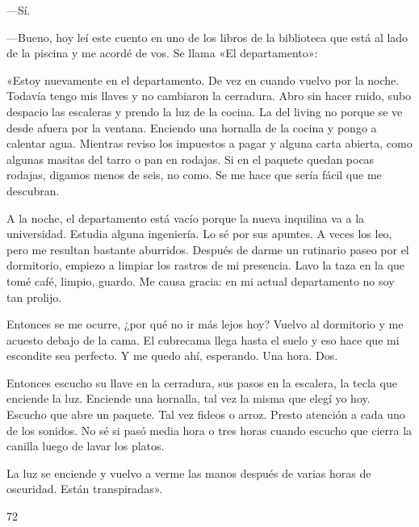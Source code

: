 \documentclass[12pt,twoside,openright,a5paper]{book}
\begin{document}
---Sí.

---Bueno, hoy leí este cuento en uno de los libros de la biblioteca que está
al lado de la piscina y me acordé de vos. Se llama «El departamento»:

«Estoy nuevamente en el departamento. De vez en cuando vuelvo por la
noche. Todavía tengo mis llaves y no cambiaron la cerradura. Abro sin hacer
ruido, subo despacio las escaleras y prendo la luz de la cocina. La del
living no porque se ve desde afuera por la ventana. Enciendo una hornalla
de la cocina y pongo a calentar agua. Mientras reviso los
impuestos a pagar y alguna carta abierta, como algunas masitas del tarro
o pan en rodajas. Si en el paquete quedan pocas rodajas, digamos menos de
seis, no como. Se me hace que sería fácil que me descubran.

A la noche, el departamento está vacío porque la nueva inquilina va a la
universidad. Estudia alguna ingeniería. Lo sé por sus apuntes. A veces los
leo, pero me resultan bastante aburridos. Después de darme un rutinario
paseo por el dormitorio, empiezo a limpiar los rastros de mi presencia. Lavo
la taza en la que tomé café, limpio, guardo. Me causa gracia: en mi
actual departamento no soy tan prolijo.

Entonces se me ocurre, ¿por qué no ir más lejos hoy? Vuelvo al dormitorio
y me acuesto debajo de la cama. El cubrecama llega hasta el suelo y eso hace
que mi escondite sea perfecto. Y me quedo ahí, esperando. Una hora. Dos.

Entonces escucho su llave en la cerradura, sus pasos en la escalera, la tecla
que enciende la luz. Enciende una hornalla, tal vez la misma que elegí yo
hoy. Escucho que abre un paquete. Tal vez fideos o arroz. Presto atención
a cada uno de los sonidos. No sé si pasó media hora o tres horas cuando
escucho que cierra la canilla luego de lavar los platos.

La luz se enciende y vuelvo a verme las manos después de varias horas de
oscuridad. Están transpiradas».

\vspace{0.5cm}

\hrulefill \hspace{0.1cm}\decofourleft\hspace{0.2cm} 72 \hspace{0.2cm}\decofourright \hspace{0.1cm}\hrulefill

\nopagebreak

\vspace{0.5cm}
\end{document}
